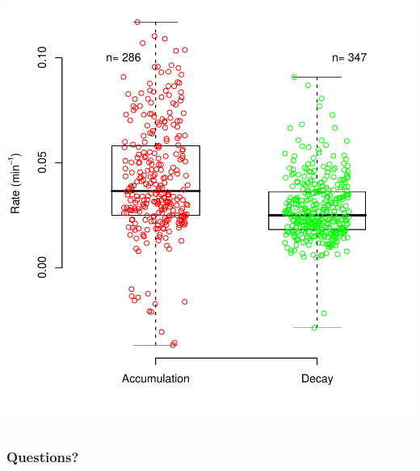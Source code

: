 \documentclass{beamer}
\begin{document}
\begin{frame}
\begin{columns}
\begin{center}
		\includegraphics[height=0.4\textheight]{figures/analysis/accum_decay_single_colors}
		\end{center}
	\end{columns}
\end{frame}

\begin{frame}
  \frametitle{Questions?}
\end{frame}
\end{document}
